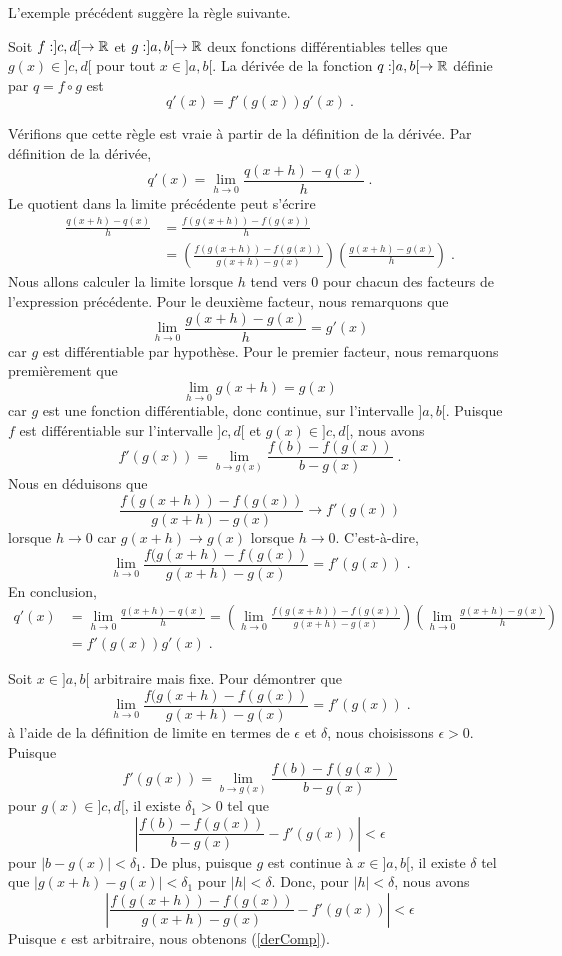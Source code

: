 {L'exemple précédent suggère la règle suivante.

\begin{theorem}
Soit $f:]c,d[\rightarrow\mathbb{R}$ et $g:]a,b[\rightarrow \mathbb{R}$ deux
fonctions différentiables telles que $g(x) \in ]c,d[$ pour tout
$x\in]a,b[$.  La dérivée de la fonction $q:]a,b[\rightarrow \mathbb{R}$
définie par $q = f \circ g$ est
\[
q'(x) = f'(g(x)) g'(x) \; .
\]
\end{theorem}

Vérifions que cette règle est vraie à partir de la définition de la
dérivée.  Par définition de la dérivée,
\[
q'(x) = \lim_{h\rightarrow 0} \frac{q(x+h)-q(x)}{h} \; .
\]
Le quotient dans la limite précédente peut s'écrire
\begin{align*}
\frac{q(x+h)-q(x)}{h} &= \frac{f(g(x+h)) - f(g(x))}{h} \\
&= \left( \frac{f(g(x+h)) - f(g(x))}{g(x+h)-g(x)} \right)
\left( \frac{g(x+h)-g(x)}{h} \right) \; .
\end{align*}
Nous allons calculer la limite lorsque $h$ tend vers $0$ pour chacun
des facteurs de l'expression précédente.  Pour le deuxième facteur, nous
remarquons que
\[
\lim_{h\rightarrow 0} \frac{g(x+h)-g(x)}{h} = g'(x)
\]
car $g$ est différentiable par hypothèse.  Pour le premier facteur,
nous remarquons premièrement que
\[
\lim_{h\rightarrow 0} g(x+h) = g(x)
\]
car $g$ est une fonction différentiable, donc continue, sur
l'intervalle $]a,b[$.  Puisque $f$ est différentiable sur l'intervalle
$]c,d[$ et $g(x) \in ]c,d[$, nous avons
\[
f'(g(x))=\lim_{b\rightarrow g(x)} \frac{f(b) - f(g(x))}{b-g(x)} \; .
\]
Nous en déduisons que
\[
\frac{f(g(x+h)) - f(g(x))}{g(x+h)-g(x)} \to f'(g(x))
\]
lorsque $h \to 0$ car $g(x+h) \to g(x)$ lorsque $h \to 0$.
C'est-à-dire,
\[
\lim_{h\rightarrow 0} \frac{f(g(x +h) - f(g(x))}{g(x+h) - g(x)}
= f'(g(x)) \; .
\]
En conclusion,
\begin{align*}
q'(x) &= \lim_{h\rightarrow 0} \frac{q(x+h)-q(x)}{h}
= \left(\lim_{h\rightarrow 0} \frac{f(g(x+h)) - f(g(x))}{g(x+h)-g(x)}\right)
\left(\lim_{h\rightarrow 0} \frac{g(x+h)-g(x)}{h}\right) \\
&= f'(g(x)) g'(x) \; .
\end{align*}

\begin{rmk}[\theory]
Soit $x \in ]a,b[$ arbitraire mais fixe.  Pour démontrer que
\begin{equation}\label{derComp}
\lim_{h\rightarrow 0} \frac{f(g(x +h) - f(g(x))}{g(x+h) - g(x)}
= f'(g(x)) \; .
\end{equation}
à l'aide de la définition de limite en termes de $\epsilon$ et
$\delta$, nous choisissons $\epsilon >0$.  Puisque
\[
f'(g(x))=\lim_{b\rightarrow g(x)} \frac{f(b) - f(g(x))}{b-g(x)}
\]
pour $g(x) \in ]c,d[$, il existe $\delta_1 >0$ tel que
\[
\left| \frac{f(b) - f(g(x))}{b-g(x)} - f'(g(x))\right| < \epsilon
\]
pour $|b-g(x)| < \delta_1$.   De plus, puisque $g$ est continue
à $x \in ]a,b[$, il existe $\delta$ tel que
$|g(x+h) - g(x)| < \delta_1$ pour $|h|< \delta$.  Donc, pour
$|h|<\delta$, nous avons
\[
\left| \frac{f(g(x+h)) - f(g(x))}{g(x+h)-g(x)} - f'(g(x))\right|
< \epsilon
\]
Puisque $\epsilon$ est arbitraire, nous obtenons (\ref{derComp}).
\end{rmk}

}
